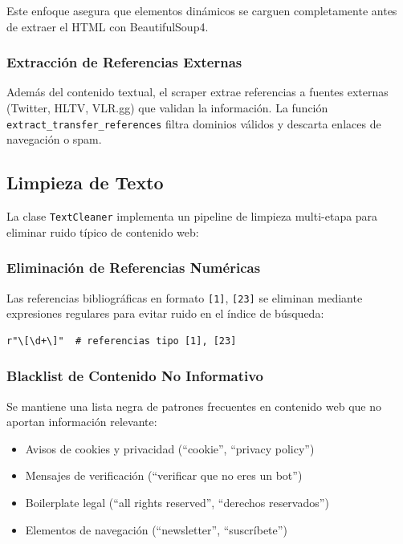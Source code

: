 Este enfoque asegura que elementos dinámicos se carguen completamente antes de extraer el HTML con BeautifulSoup4.

\subsubsection{Extracción de Referencias Externas}

Además del contenido textual, el scraper extrae referencias a fuentes externas (Twitter, HLTV, VLR.gg) que validan la información. La función \texttt{extract\_transfer\_references} filtra dominios válidos y descarta enlaces de navegación o spam.

\subsection{Limpieza de Texto}

La clase \texttt{TextCleaner} implementa un pipeline de limpieza multi-etapa para eliminar ruido típico de contenido web:

\subsubsection{Eliminación de Referencias Numéricas}

Las referencias bibliográficas en formato \texttt{[1]}, \texttt{[23]} se eliminan mediante expresiones regulares para evitar ruido en el índice de búsqueda:

\begin{verbatim}
r"\[\d+\]"  # referencias tipo [1], [23]
\end{verbatim}

\subsubsection{Blacklist de Contenido No Informativo}

Se mantiene una lista negra de patrones frecuentes en contenido web que no aportan información relevante:

\begin{itemize}
    \item Avisos de cookies y privacidad (``cookie'', ``privacy policy'')
    \item Mensajes de verificación (``verificar que no eres un bot'')
    \item Boilerplate legal (``all rights reserved'', ``derechos reservados'')
    \item Elementos de navegación (``newsletter'', ``suscríbete'')
\end{itemize}

